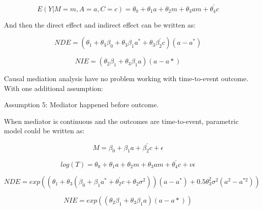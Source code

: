 \documentclass{article}
\begin{document}
\begin{equation}
E (Y |M = m,A = a,C = c) = \theta_0+\theta_1 a+ \theta_2 m + \theta_3 a m + \theta_4^{'} c
\end{equation}

And then the direct effect and indirect effect can be written as:

\begin{equation}
NDE = (\theta_1 + \theta_3 \beta_0 + \theta_3 \beta_1 a^* + \theta_3 \beta_2^{'} c)(a - a^*)
\end{equation}

\begin{equation}
NIE = (\theta_2 \beta_1 + \theta_3 \beta_1 a)(a - a*)
\end{equation}


Causal mediation analysis have no problem working with time-to-event outcome. With one additional assumption:\newline

Assumption 5:  Mediator happened before outcome.\newline


When mediator is continuous and the outcomes are time-to-event, parametric model could be written as:\


\begin{equation}
M =  \beta_0+\beta_1 a+ \beta_2^{'} c + \epsilon
\end{equation}



\begin{equation}
log(T) = \theta_0+\theta_1 a+ \theta_2 m + \theta_3 a m + \theta_4^{'} c + v \epsilon
\end{equation}



\begin{equation}
NDE = exp((\theta_1 + \theta_3 (\beta_0 + \beta_1 a^* +  \theta_2^{'} c + \theta_2 \sigma^2))(a - a^*) + 0.5 \theta_3 ^2 \sigma^2 (a^2 - a^{*2}))
\end{equation}



\begin{equation}
NIE = exp((\theta_2 \beta_1 + \theta_3 \beta_1 a)(a - a*))
\end{equation}
\end{document}
